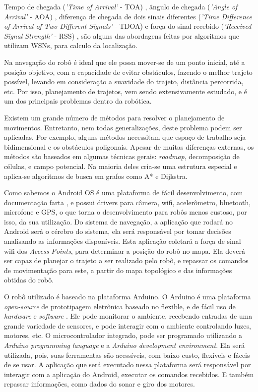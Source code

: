 \documentclass[12pt]{article}
\begin{document}
	Tempo de chegada (\textit{'Time of Arrival'} - TOA) \cite{gps}, ângulo de chegada (\textit{'Angle of Arrival'} - AOA) \cite{aoa}, 
	diferença de chegada de dois sinais diferentes (\textit{'Time Difference of Arrival of Two Different Signals'} - TDOA) \cite{tdoa} 
	e força do sinal recebido (\textit{'Received Signal Strength'} - RSS) \cite{wifiRadar}, são alguns das abordagens feitas por algoritmos que utilizam WSNs,
	para calculo da localização.	
	
	Na navegação do robô é ideal que ele possa mover-se de um ponto inicial, até a posição objetivo, com a capacidade de evitar obstáculos, 
	fazendo o melhor trajeto possível, levando em consideração a suavidade do trajeto, distância percorrida, etc. Por isso, planejamento de trajetos, 
	vem sendo extensivamente estudado, e é um dos principais problemas dentro da robótica.
	
	Existem um grande número de métodos para resolver o planejamento de movimentos. Entretanto, nem todas generalizações,
	deste problema podem ser aplicadas. Por exemplo, alguns métodos necessitam que espaço de trabalho seja bidimensional e os obstáculos poligonais.
	Apesar de muitas diferenças externas, os métodos são baseados em algumas técnicas gerais: \textit{roadmap}, decomposição de células,
	 e campo potencial. Na maioria deles cria-se uma estrutura especial e aplica-se algoritmos de 
	 busca em grafos como A*\cite{dlite} e Dijkstra\cite{voronoi}.
	
	
	Como sabemos o Android OS \cite{androidSite} é uma plataforma de fácil desenvolvimento, com documentação farta \cite{androidDev}, e possui drivers para câmera, wifi, acelerômetro, 
	bluetooth, microfone e GPS, o que torna o desenvolvimento para robôs menos custoso\cite{androidRobot}, por isso, da sua utilização.  Do sistema de navegação, 
	a aplicação que rodará no Android será o cérebro do sistema, ela será responsável por tomar decisões analisando as informações disponíveis.
  Esta aplicação coletará a força de sinal wifi dos \textit{Access Points}, para determinar a posição do robô no mapa. Ela deverá ser capaz de
   planejar o trajeto a ser realizado pelo robô, e repassar os comandos de movimentação para este, a partir do mapa topológico e das 
  informações obtidas do robô.
  
  O robô utilizado é baseado na plataforma Arduino. 
  O Arduino é uma plataforma \textit{open-source} de prototipagem eletrônica baseado no flexible, e de fácil uso de \textit{hardware} e \textit{software} \cite{arduinoSite}.
  Ele pode monitorar o ambiente, recebendo entradas de uma grande variedade de sensores, e pode interagir com o ambiente controlando luzes, motores, etc. O microcontrolador
  integrado, pode ser programado utilizando a \textit{Arduino programming language} e a \textit{Arduino development environment}. Ela será utilizada, pois, suas
   ferramentas são acessíveis, com baixo custo, flexíveis e fáceis de se usar. A aplicação que será executado nessa plataforma será responsável por interagir com 
   a aplicação do Android, executar os comandos recebidos. E também repassar informações, como dados do sonar e giro dos motores.
  
\end{document}
